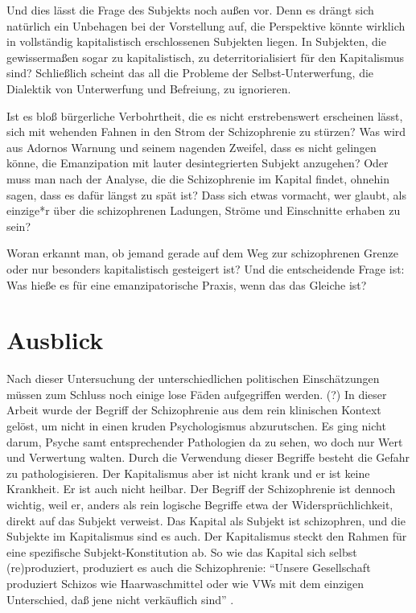 \documentclass[12pt,
               paper=a4,
               twoside=false,
               onehalfspacing,
               bibliography=totoc,
               toc=graduated,
               ]{scrartcl}
\newcommand{\pc}[2]{\parencite[#1]{#2}}
\begin{document}
Und dies lässt die Frage des Subjekts noch außen vor. Denn es drängt
sich natürlich ein Unbehagen bei der Vorstellung auf, die Perspektive
könnte wirklich in vollständig kapitalistisch erschlossenen Subjekten
liegen. In Subjekten, die gewissermaßen sogar zu kapitalistisch, zu
deterritorialisiert für den Kapitalismus sind? Schließlich scheint das
all die Probleme der Selbst-Unterwerfung, die Dialektik von
Unterwerfung und Befreiung, zu ignorieren.

Ist es bloß bürgerliche Verbohrtheit, die es nicht erstrebenswert
erscheinen lässt, sich mit wehenden Fahnen in den Strom der
Schizophrenie zu stürzen? Was wird aus Adornos Warnung und seinem
nagenden Zweifel, dass es nicht gelingen könne, die Emanzipation mit
lauter desintegrierten Subjekt anzugehen? Oder muss man nach der
Analyse, die die Schizophrenie im Kapital findet, ohnehin sagen, dass
es dafür längst zu spät ist? Dass sich etwas vormacht, wer glaubt, als
einzige*r über die schizophrenen Ladungen, Ströme und Einschnitte
erhaben zu sein?

Woran erkannt man, ob jemand gerade auf dem Weg zur schizophrenen
Grenze oder nur besonders kapitalistisch gesteigert ist? Und die
entscheidende Frage ist: Was hieße es für eine emanzipatorische
Praxis, wenn das das Gleiche ist?



\section{Ausblick}

Nach dieser Untersuchung der unterschiedlichen politischen
Einschätzungen müssen zum Schluss noch einige lose Fäden aufgegriffen
werden. (?) In dieser Arbeit wurde der Begriff der Schizophrenie aus
dem rein klinischen Kontext gelöst, um nicht in einen kruden
Psychologismus abzurutschen. Es ging nicht darum, Psyche samt
entsprechender Pathologien da zu sehen, wo doch nur Wert und
Verwertung walten. Durch die Verwendung dieser Begriffe besteht die
Gefahr zu pathologisieren. Der Kapitalismus aber ist nicht krank und
er ist keine Krankheit. Er ist auch nicht heilbar. Der Begriff der
Schizophrenie ist dennoch wichtig, weil er, anders als rein logische
Begriffe etwa der Widersprüchlichkeit, direkt auf das Subjekt
verweist. Das Kapital als Subjekt ist schizophren, und die Subjekte im
Kapitalismus sind es auch. Der Kapitalismus steckt den Rahmen für
eine spezifische Subjekt-Konstitution ab. So wie das Kapital sich
selbst (re)produziert, produziert es auch die Schizophrenie: "`Unsere
Gesellschaft produziert Schizos wie Haarwaschmittel oder wie VWs mit
dem einzigen Unterschied, daß jene nicht verkäuflich sind"' \pc{S. 315
f.}{ao}.
\end{document}
